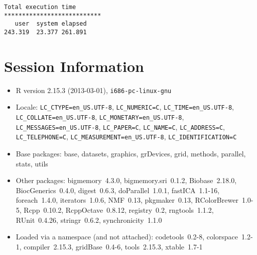 \documentclass[10pt]{article}
\begin{document}
\begin{verbatim}
Total execution time
***************************
   user  system elapsed 
243.319  23.377 261.891 

\end{verbatim}

\section*{Session Information}
\begin{itemize}\raggedright
  \item R version 2.15.3 (2013-03-01), \verb|i686-pc-linux-gnu|
  \item Locale: \verb|LC_CTYPE=en_US.UTF-8|, \verb|LC_NUMERIC=C|, \verb|LC_TIME=en_US.UTF-8|, \verb|LC_COLLATE=en_US.UTF-8|, \verb|LC_MONETARY=en_US.UTF-8|, \verb|LC_MESSAGES=en_US.UTF-8|, \verb|LC_PAPER=C|, \verb|LC_NAME=C|, \verb|LC_ADDRESS=C|, \verb|LC_TELEPHONE=C|, \verb|LC_MEASUREMENT=en_US.UTF-8|, \verb|LC_IDENTIFICATION=C|
  \item Base packages: base, datasets, graphics, grDevices, grid,
    methods, parallel, stats, utils
  \item Other packages: bigmemory~4.3.0, bigmemory.sri~0.1.2,
    Biobase~2.18.0, BiocGenerics~0.4.0, digest~0.6.3, doParallel~1.0.1,
    fastICA~1.1-16, foreach~1.4.0, iterators~1.0.6, NMF~0.13,
    pkgmaker~0.13, RColorBrewer~1.0-5, Rcpp~0.10.2, RcppOctave~0.8.12,
    registry~0.2, rngtools~1.1.2, RUnit~0.4.26, stringr~0.6.2,
    synchronicity~1.1.0
  \item Loaded via a namespace (and not attached): codetools~0.2-8,
    colorspace~1.2-1, compiler~2.15.3, gridBase~0.4-6, tools~2.15.3,
    xtable~1.7-1
\end{itemize}
\end{document}
